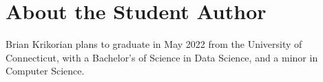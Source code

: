 \documentclass[12pt]{article}
\begin{document}









\section*{About the Student Author}
Brian Krikorian plans to graduate in May 2022 from the University of 
Connecticut, with a Bachelor's of Science in Data Science, and a minor in 
Computer Science.


\end{document}
